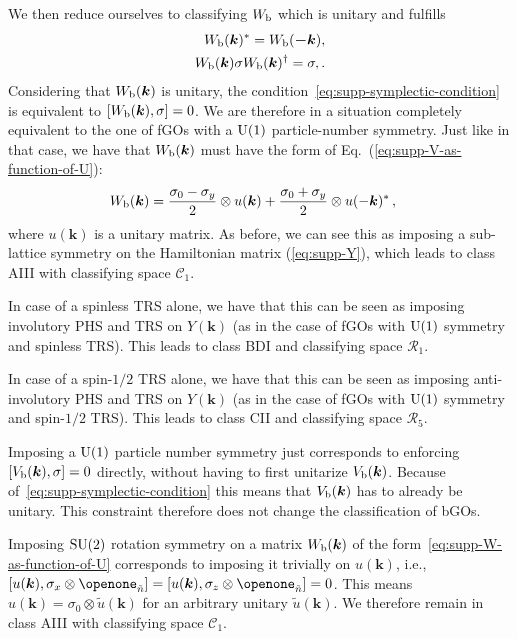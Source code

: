 \documentclass[prl,twocolumn,preprintnumbers,superscriptaddress,amsmath,amssymb]{revtex4-1}
\begin{document}
We then reduce ourselves to classifying $W_{\rm b}$ which is unitary and fulfills
\begin{align}
    W_{\rm b}(\boldsymbol{k})^*=W_{\rm b}(\boldsymbol{-k}),\\
    W_{\rm b}(\boldsymbol{k})\sigma W_{\rm b}(\boldsymbol{k})^\dag=\sigma, \label{eq:supp-symplectic-condition}.
\end{align}
Considering that $W_{\rm b}(\boldsymbol{k})$ is unitary, the condition~\eqref{eq:supp-symplectic-condition} is equivalent to $[W_{\rm b}(\boldsymbol{k}),\sigma]=0$. We are therefore in a situation completely equivalent to the one of fGOs with a ${\rm U}(1)$ particle-number symmetry. Just like in that case, we have that $W_{\rm b}(\boldsymbol{k})$ must have the form of Eq.~(\ref{eq:supp-V-as-function-of-U}):
\begin{align}
W_{\rm b}(\boldsymbol{k})&=
\frac{\sigma_0-\sigma_y}{2}\otimes u(\boldsymbol{k}) + \frac{\sigma_0+\sigma_y}{2}\otimes u(-\boldsymbol{k})^*\,,
\label{eq:supp-W-as-function-of-U}
\end{align}
where $u(\boldsymbol{k})$ is a unitary matrix. As before, we can see this as imposing a sub-lattice symmetry on the Hamiltonian matrix (\ref{eq:supp-Y}), which leads to class AIII with classifying space $\mathcal{C}_1$.

In case of a spinless TRS alone, we have that this can be seen as imposing involutory PHS and TRS on $Y(\boldsymbol{k})$ (as in the case of fGOs with ${\rm U}(1)$ symmetry and spinless TRS). This leads to class BDI and classifying space $\mathcal{R}_1$.

In case of a spin-$1/2$ TRS alone, we have that this can be seen as imposing anti-involutory PHS and TRS on $Y(\boldsymbol{k})$ (as in the case of fGOs with ${\rm U}(1)$ symmetry and spin-$1/2$ TRS). This leads to class CII and classifying space $\mathcal{R}_5$.

Imposing a ${\rm U}(1)$ particle number symmetry just corresponds to enforcing $[V_{\rm b}(\boldsymbol{k}),\sigma]=0$ directly, without having to first unitarize $V_{\rm b}(\boldsymbol{k})$. Because of~\eqref{eq:supp-symplectic-condition} this means that $V_{\rm b}(\boldsymbol{k})$ has to already be unitary. This constraint therefore does not change the classification of bGOs.

Imposing ${\rm SU}(2)$ rotation symmetry on a matrix $W_{\rm b}(\boldsymbol{k})$ of the form~\eqref{eq:supp-W-as-function-of-U} corresponds to imposing it trivially on $u(\boldsymbol{k})$, i.e., $[u(\boldsymbol{k}),\sigma_x\otimes\openone_{\tilde n}]=[u(\boldsymbol{k}),\sigma_z\otimes\openone_{\tilde n}]=0$. This means $u(\boldsymbol{k})=\sigma_0 \otimes \tilde u(\boldsymbol{k})$ for an arbitrary unitary $\tilde u(\boldsymbol{k})$. We therefore remain in class AIII with classifying space $\mathcal{C}_1$.
\end{document}
